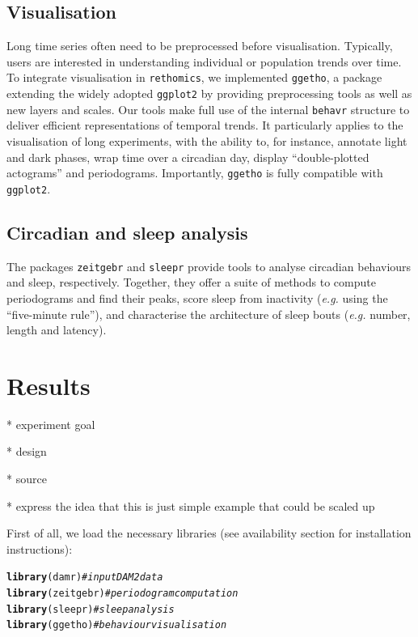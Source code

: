 \documentclass[10pt,letterpaper]{article}\usepackage[]{graphicx}\usepackage[]{color}
\makeatletter
\newcommand{\hlcom}[1]{\textcolor[rgb]{0.678,0.584,0.686}{\textit{#1}}}%
\newcommand{\hlstd}[1]{\textcolor[rgb]{0.345,0.345,0.345}{#1}}%
\newcommand{\hlkwd}[1]{\textcolor[rgb]{0.737,0.353,0.396}{\textbf{#1}}}%
\newenvironment{kframe}{%
 \def\at@end@of@kframe{}%
 \ifinner\ifhmode%
  \def\at@end@of@kframe{\end{minipage}}%
  \begin{minipage}{\columnwidth}%
 \fi\fi%
 \def\FrameCommand##1{\hskip\@totalleftmargin \hskip-\fboxsep
 \colorbox{shadecolor}{##1}\hskip-\fboxsep
     \hskip-\linewidth \hskip-\@totalleftmargin \hskip\columnwidth}%
 \MakeFramed {\advance\hsize-\width
   \@totalleftmargin\z@ \linewidth\hsize
   \@setminipage}}%
 {\par\unskip\endMakeFramed%
 \at@end@of@kframe}
\newenvironment{knitrout}{}{} %
\newcommand{\TODO}[2][]{\todo[color=red, fancyline, #1]{\textbf{TODO:} #2}}
\makeatother
\begin{document}
\subsection*{Visualisation}
Long time series often need to be preprocessed before visualisation.
Typically, users are interested in understanding individual or population trends over time.
To integrate visualisation in \texttt{rethomics},
we implemented \texttt{ggetho}, a package extending the widely adopted \texttt{ggplot2}\cite{wickham_ggplot2:_2016} by providing preprocessing tools as well as new layers and scales.
Our tools make full use of the internal \texttt{behavr} structure to deliver efficient representations of temporal trends.
It particularly applies to the visualisation of long experiments, with the ability to, for instance, annotate light and dark phases, wrap time over a circadian day, display ``double-plotted actograms'' and periodograms. 
Importantly, \texttt{ggetho} is fully compatible with \texttt{ggplot2}.

\subsection*{Circadian and sleep analysis}
The packages \texttt{zeitgebr} and \texttt{sleepr} provide tools to analyse circadian behaviours and sleep, respectively.
Together, they offer a suite of methods to compute periodograms and find their peaks, score sleep from inactivity (\emph{e.g.} using the ``five-minute rule''), and characterise the architecture of sleep bouts (\emph{e.g.} number, length and latency).







\section*{Results}

\TODO{resut intro here}

* experiment goal

* design

* source

* express the idea that this is just simple example that could be scaled up



First of all, we load the necessary libraries (see availability section for installation instructions):
\begin{knitrout}
\color{fgcolor}\begin{kframe}
\begin{alltt}
\hlkwd{library}\hlstd{(damr)}      \hlcom{# input DAM2 data}
\hlkwd{library}\hlstd{(zeitgebr)}  \hlcom{# periodogram computation}
\hlkwd{library}\hlstd{(sleepr)}    \hlcom{# sleep analysis}
\hlkwd{library}\hlstd{(ggetho)}    \hlcom{# behaviour visualisation}
\end{alltt}
\end{kframe}
\end{knitrout}
\end{document}
